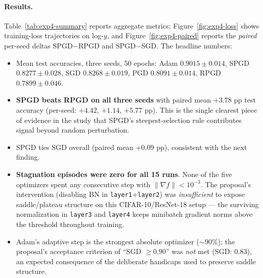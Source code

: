 \documentclass[11pt]{article}
\begin{document}
\paragraph{Results.} Table~\ref{tab:exp4-summary} reports aggregate
metrics; Figure~\ref{fig:exp4-loss} shows training-loss trajectories
on log-$y$, and Figure~\ref{fig:exp4-paired} reports the
\emph{paired} per-seed deltas SPGD$-$RPGD and SPGD$-$SGD. The
headline numbers:

\begin{itemize}[leftmargin=*,itemsep=1pt,topsep=2pt]
  \item Mean test accuracies, three seeds, 50 epochs:
        Adam $0.9015 \pm 0.014$,
        SPGD $0.8277 \pm 0.028$,
        SGD  $0.8268 \pm 0.019$,
        PGD  $0.8091 \pm 0.014$,
        RPGD $0.7899 \pm 0.046$.
  \item \textbf{SPGD beats RPGD on all three seeds} with paired mean
        $+3.78$ pp test accuracy (per-seed: $+4.42$, $+1.14$, $+5.77$
        pp). This is the single clearest piece of evidence in the
        study that SPGD's steepest-selection rule contributes signal
        beyond random perturbation.
  \item SPGD ties SGD overall (paired mean $+0.09$ pp), consistent
        with the next finding.
  \item \textbf{Stagnation episodes were zero for all 15 runs}. None
        of the five optimizers spent any consecutive step with
        $\|\nabla f\| < 10^{-3}$. The proposal's intervention
        (disabling BN in \texttt{layer1}+\texttt{layer2}) was
        \emph{insufficient} to expose saddle/plateau structure on
        this CIFAR-10/ResNet-18 setup --- the surviving normalization
        in \texttt{layer3} and \texttt{layer4} keeps minibatch
        gradient norms above the threshold throughout training.
  \item Adam's adaptive step is the strongest absolute optimizer
        ($\sim\!90\%$); the proposal's acceptance criterion of
        ``SGD $\geq 0.90$'' was \emph{not} met (SGD: 0.83), an
        expected consequence of the deliberate handicaps used to
        preserve saddle structure.
\end{itemize}
\end{document}

